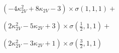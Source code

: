 $\left(- 4 \kappa_{2V}^{2} + 8 \kappa_{2V} - 3\right) \times \sigma{\left(1,1,1 \right)} +$

$ \left(2 \kappa_{2V}^{2} - 5 \kappa_{2V} + 3\right) \times \sigma{\left(\frac{1}{2},1,1 \right)} +$

$ \left(2 \kappa_{2V}^{2} - 3 \kappa_{2V} + 1\right) \times \sigma{\left(\frac{3}{2},1,1 \right)}$
